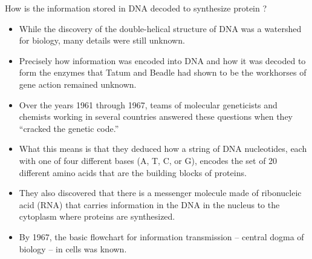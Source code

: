 \documentclass[11pt,dvipsnames,ignorenonframetext,aspectratio=169]{beamer}
\providecommand{\tightlist}{%
  \setlength{\itemsep}{0pt}\setlength{\parskip}{0pt}}
\begin{document}
\begin{frame}{How is the information stored in DNA decoded to synthesize
protein ?}
\protect\hypertarget{how-is-the-information-stored-in-dna-decoded-to-synthesize-protein}{}
\begin{itemize}
\tightlist
\item
  While the discovery of the double-helical structure of DNA was a
  watershed for biology, many details were still unknown.
\item
  Precisely how information was encoded into DNA and how it was decoded
  to form the enzymes that Tatum and Beadle had shown to be the
  workhorses of gene action remained unknown.
\item
  Over the years 1961 through 1967, teams of molecular geneticists and
  chemists working in several countries answered these questions when
  they ``cracked the genetic code.''
\end{itemize}
\end{frame}

\begin{frame}{}
\protect\hypertarget{section-1}{}
\begin{itemize}
\tightlist
\item
  What this means is that they deduced how a string of DNA nucleotides,
  each with one of four different bases (A, T, C, or G), encodes the set
  of 20 different amino acids that are the building blocks of proteins.
\item
  They also discovered that there is a messenger molecule made of
  ribonucleic acid (RNA) that carries information in the DNA in the
  nucleus to the cytoplasm where proteins are synthesized.
\item
  By 1967, the basic flowchart for information transmission -- central
  dogma of biology -- in cells was known.
\end{itemize}
\end{frame}
\end{document}
